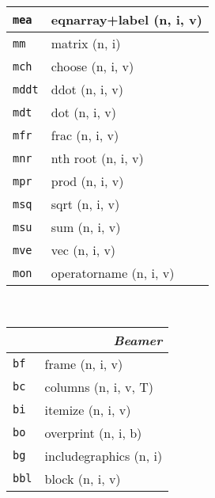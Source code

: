\documentclass[oneside,10pt,landscape,DIV16]{scrartcl}
\newcommand{\Map}[1] {\textbf{\textasciiacute}\texttt{#1}}
\begin{document}
\begin{multicols}{3}
\begin{center}
\begin{tabular}[]{|p{11mm}|p{62mm}|}
\hline  \Map{mea} & eqnarray+label            \hfill (n, i, v)\\
\hline  \Map{mm}  & matrix                    \hfill (n, i)\\
\hline
\hline  \Map{mch} & choose                    \hfill (n, i, v)\\
\hline  \Map{mddt}& ddot                      \hfill (n, i, v)\\
\hline  \Map{mdt} & dot                       \hfill (n, i, v)\\
\hline  \Map{mfr} & frac                      \hfill (n, i, v)\\
\hline  \Map{mnr} & nth root                  \hfill (n, i, v)\\
\hline  \Map{mpr} & prod                      \hfill (n, i, v)\\
\hline  \Map{msq} & sqrt                      \hfill (n, i, v)\\
\hline  \Map{msu} & sum                       \hfill (n, i, v)\\
\hline  \Map{mve} & vec                       \hfill (n, i, v)\\
\hline  \Map{mon} & operatorname              \hfill (n, i, v)\\
\hline
%
\end{tabular}\\
%
\newpage
%
\begin{tabular}[]{|p{11mm}|p{60mm}|}
\hline
\multicolumn{2}{|r|}{\textsl{B\textbf{e}amer}}\\[1.0ex]
\hline \Map{bf}  & frame           \hfill (n, i, v)\\
\hline \Map{bc}  & columns         \hfill (n, i, v, T)\\
\hline \Map{bi}  & itemize         \hfill (n, i, v)\\
\hline \Map{bo}  & overprint       \hfill (n, i, b)\\
\hline \Map{bg}  & includegraphics \hfill (n, i)\\
\hline \Map{bbl} & block           \hfill (n, i, v)\\
\hline

\end{tabular}
\end{center}
\end{multicols}
\end{document}
